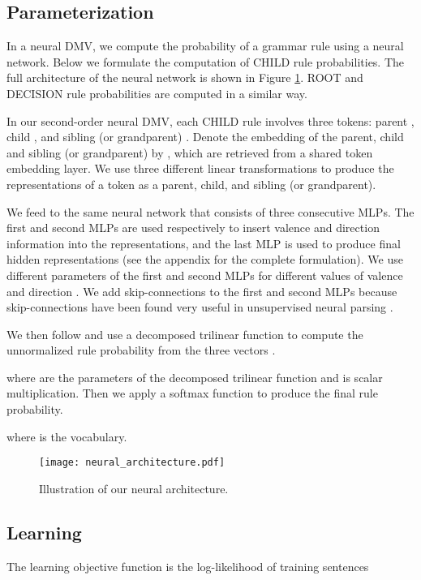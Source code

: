 \documentclass[11pt]{article}
\begin{document}
\subsection{Parameterization}
\label{section: parameterization}
In a neural DMV, we compute the probability of a grammar rule using a neural network. Below we formulate the computation of CHILD rule probabilities. The full architecture of the neural network is shown in Figure \ref{neural architecture}.
ROOT and DECISION rule probabilities are computed in a similar way.

In our second-order neural DMV, each CHILD rule  involves three tokens: parent , child , and sibling (or grandparent) . 
Denote the embedding of the parent, child and sibling (or grandparent) by , which are retrieved from a shared token embedding layer. We use three different linear transformations to produce the representations of a token as a parent, child, and sibling (or grandparent).

We feed  to the same neural network that consists of three consecutive MLPs. The first and second MLPs are used respectively to insert valence and direction information into the representations, and the last MLP is used to produce final hidden representations  (see the appendix for the complete formulation). We use different parameters of the first and second MLPs for different values of valence  and direction . We add skip-connections to the first and second MLPs because skip-connections have been found very useful in unsupervised neural parsing \cite{DBLP:conf/acl/KimDR19}. 

We then follow  and use a decomposed trilinear function to compute the unnormalized rule probability from the three vectors . 
 

where  are the parameters of the decomposed trilinear function and  is scalar multiplication.
Then we apply a softmax function to produce the final rule probability. 

where  is the vocabulary. 


\begin{figure}[ht]   \centering  

    \texttt{[image: neural\_architecture.pdf]}   \caption{Illustration of our neural architecture.}   \label{neural architecture}  \end{figure}


\subsection{Learning}
\label{dmo}
The learning objective function  is the log-likelihood of training sentences 
   
\end{document}
